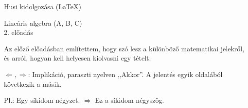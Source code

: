 \documentclass[a4paper,11.5pt]{article}
\begin{document}
	\setlength\parindent{0pt}
	\def\a{\textbf{a}}
	\def\b{\textbf{b}}
	\def\N{\hskip 10 true mm}
	\def\a{\textbf{a}}
	\def\b{\textbf{b}}
	\def\c{\textbf{c}}
	\def\d{\textbf{d}}
	\def\x{\textbf{x}}
	\def\e{\textbf{e}}
	\def\gg{$\gamma$}
	\def\vi{\textbf{i}}
	\def\jj{\textbf{j}}
	\def\kk{\textbf{k}}
	\def\fh{\overrightarrow}
	\def\l{\lambda}
	\def\m{\mu}
	\def\v{\textbf{v}}
	\def\0{\textbf{0}}
	\def\s{\hspace{0.2mm}\vphantom{\beta}}
	\def\Z{\mathbb{Z}}
	\def\Q{\mathbb{Q}}
	\def\R{\mathbb{R}}
	\def\C{\mathbb{C}}
	\def\N{\mathbb{N}}
	\def\Rn{\mathbb{R}^{n}}
	\def\Ra{\overline{\mathbb{R}}}
	\def\sume{\displaystyle\sum_{n=1}^{+\infty}}
	\def\sumn{\displaystyle\sum_{n=0}^{+\infty}}
	\def\biz{\emph{Bizonyítás:\ }}
	\def\narrow{\underset{n\rightarrow+\infty}{\longrightarrow}}
	\def\limn{\displaystyle\lim_{n\to +\infty}}
	
	\theoremstyle{definition}
	\newtheorem{theorem}{Tétel}[subsubsection]
	
	\theoremstyle{definition}
	\newtheorem{definition}[theorem]{Definíció}
	\newtheorem{example}[theorem]{Példa}
	\newtheorem{exercise}[theorem]{Házi feladat}
	\newtheorem{note}[theorem]{Megjegyzés}
	\newtheorem{task}[theorem]{Feladat}
	\newtheorem{revision}[theorem]{Emlékeztető}
	
	
	\begin{flushright}
		
		Husi kidolgozása (\LaTeX)
		
	\end{flushright}
	
	\begin{center}
		
		Lineáris algebra (A, B, C)\\
		
		2. előadás
		
	\end{center}
	
	Az előző előadásban említettem, hogy szó lesz a különböző matematikai jelekről, és arról, hogyan kell helyesen kiolvasni egy tételt:
	
	\smallskip
	$\Leftarrow, \Rightarrow$: Implikáció, paraszti nyelven ,,Akkor''. A jelentés egyik oldalából következik a másik.
	
	Pl.: Egy síkidom négyzet. $\Rightarrow$ Ez a síkidom négyszög.
	
\end{document}
